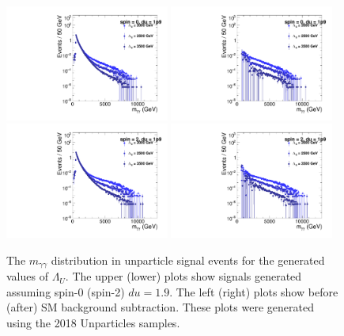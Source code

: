 \begin{figure}[tbp!]
\begin{center}
\includegraphics[angle=0,width=0.48\textwidth]{fig/UnparToGG_Spin0_du1p9_TuneCP2_13TeV_pythia8_2018.pdf}
\includegraphics[angle=0,width=0.48\textwidth]{fig/UnparToGG_Spin0_du1p9_TuneCP2_13TeV_pythia8_2018_bkg_sub.pdf}
\includegraphics[angle=0,width=0.48\textwidth]{fig/UnparToGG_Spin2_du1p9_TuneCP2_13TeV_pythia8_2018.pdf}
\includegraphics[angle=0,width=0.48\textwidth]{fig/UnparToGG_Spin2_du1p9_TuneCP2_13TeV_pythia8_2018_bkg_sub.pdf}
\end{center}
\caption{The $m_{\gamma\gamma}$ distribution in unparticle signal events for the generated values of $\Lambda_U$. The upper (lower) plots show signals generated assuming spin-0 (spin-2) $du = 1.9$. The left (right) plots show before (after) SM background subtraction. These plots were generated using the 2018 Unparticles samples.
}
\label{fig:BkgSub}
\end{figure}


